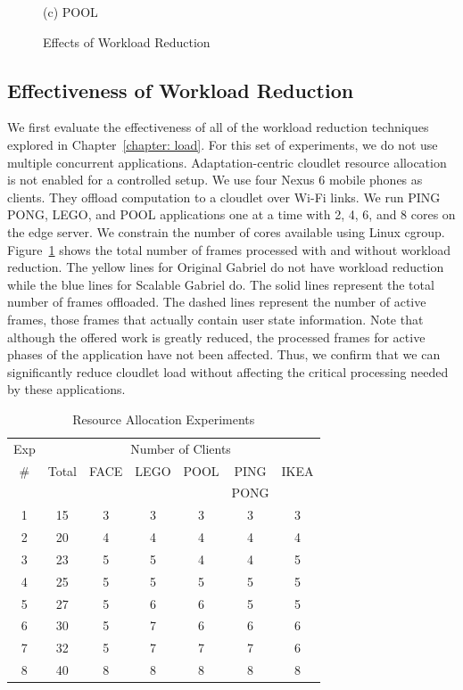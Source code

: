 \begin{figure}
\begin{minipage}[b]{0.3\linewidth}
{(c) POOL}
\end{minipage}
\caption{Effects of Workload Reduction}
\label{figs:workload-reduction}
\end{figure}


\subsection{Effectiveness of Workload Reduction}

We first evaluate the effectiveness of all of the workload reduction techniques
explored in Chapter~\ref{chapter: load}. For this set of experiments, we do not
use multiple concurrent applications. Adaptation-centric cloudlet resource
allocation is not enabled for a controlled setup. We use four Nexus 6 mobile
phones as clients. They offload computation to a cloudlet over Wi-Fi links. We
run PING PONG, LEGO, and POOL applications one at a time with 2, 4, 6, and 8
cores on the edge server. We constrain the number of cores available using Linux
cgroup. Figure~\ref{figs:workload-reduction} shows the total number of frames
processed with and without workload reduction. The yellow lines for Original
Gabriel do not have workload reduction while the blue lines for Scalable Gabriel
do. The solid lines represent the total number of frames offloaded. The dashed
lines represent the number of active frames, those frames that actually contain
user state information. Note that although the offered work is greatly reduced,
the processed frames for active phases of the application have not been
affected. Thus, we confirm that we can significantly reduce cloudlet load
without affecting the critical processing needed by these applications.

\begin{table}[]
\centering
\begin{tabular}{|c|c||c|c|c|c|c|}
  \hline
  Exp & \multicolumn{6}{|c|}{Number of Clients} \\
  \cline{2-7}
  \#  & Total & FACE & LEGO & POOL & PING & IKEA \\
      &      &   &   &  & PONG &  \\ \hline
  1   & 15  & 3 & 3 & 3 & 3 & 3 \\ \hline
  2   & 20  & 4 & 4 & 4 & 4 & 4 \\ \hline
  3   & 23  & 5 & 5 & 4 & 4 & 5\\ \hline
  4   & 25  & 5 & 5 & 5 & 5 & 5 \\ \hline
  5   & 27  & 5 & 6 & 6 & 5 & 5 \\ \hline
  6  & 30  & 5 & 7 & 6 & 6 & 6 \\ \hline
  7  & 32  & 5 & 7 & 7 & 7 & 6 \\ \hline
  8  & 40  & 8 & 8 & 8 & 8 & 8 \\ \hline
\end{tabular}
\vspace{0.1in}
\caption{Resource Allocation Experiments} 
\label{tab:alloc-exps}
\end{table}

